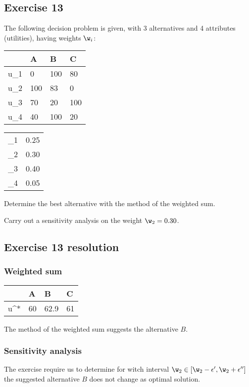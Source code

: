 \documentclass[\main/main.tex]{subfiles}
\begin{document}
\subsection{Exercise 13}
The following decision problem is given, with 3 alternatives and 4 attributes (utilities), having weights $\w_i$:

\begin{table}
  \begin{tabular}{L|LLL}
     & A   & B   & C   \\
    \hline
    u_1               & 0   & 100 & 80  \\
    u_2               & 100 & 83  & 0   \\
    u_3               & 70  & 20  & 100 \\
    u_4               & 40  & 100 & 20
  \end{tabular}
  \begin{tabular}{L|L}
         &  \\
    \hline
    \w_1 & 0.25           \\
    \w_2 & 0.30           \\
    \w_3 & 0.40           \\
    \w_4 & 0.05
  \end{tabular}
\end{table}

Determine the best alternative with the method of the weighted sum.

Carry out a sensitivity analysis on the weight $\w_2 = 0.30$.

\subsection{Exercise 13 resolution}
\subsubsection*{Weighted sum}
\begin{table}
  \begin{tabular}{L|LLL}
     & A  & B    & C  \\
    \hline
    u^*               & 60 & 62.9 & 61 \\
  \end{tabular}
\end{table}
The method of the weighted sum suggests the alternative $B$.

\subsubsection*{Sensitivity analysis}
The exercise require us to determine for witch interval $\w_2 \in [\w_2 - \epsilon', \w_2 + \epsilon'']$ the suggested alternative $B$ does not change as optimal solution.
\end{document}
